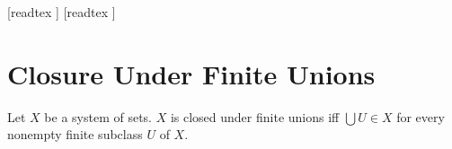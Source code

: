 \documentclass[10pt]{article}
\begin{document}
  \begin{imports}
    \begin{forthel}
      [readtex ]
      [readtex ]
    \end{forthel}
  \end{imports}


  \section*{Closure Under Finite Unions}

  \begin{forthel}
    \begin{definition}
      Let $X$ be a system of sets.
      $X$ is closed under finite unions iff $\bigcup U \in X$ for every nonempty finite subclass $U$ of $X$.
    \end{definition}
  \end{forthel}
\end{document}
